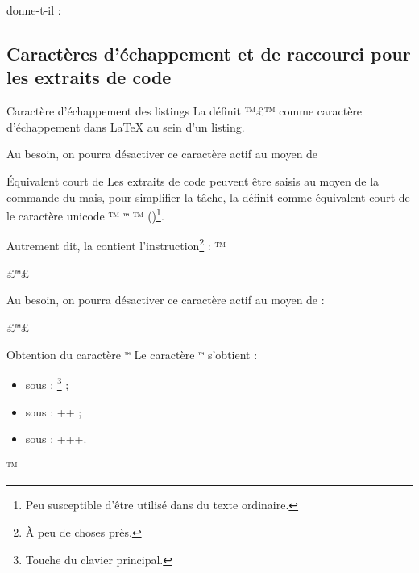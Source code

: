 \documentclass{letgut}
\begin{document}
donne-t-il :

\endgroup

\subsection{Caractères d'échappement et de raccourci pour les
  extraits de code}
\label{sec:caract-dech-et}

\begin{dbwarning}{Caractère d'échappement des listings}{}
  \lstset{escapechar=}%
  La  définit ™£™ comme caractère d'échappement dans \LaTeX{} au
  sein d'un listing.
\end{dbwarning}

Au besoin, on pourra désactiver ce caractère actif au moyen de
\begin{ltx-code}
\lstset{escapechar=}
\end{ltx-code}

\begin{dbwarning}{Équivalent court de }{}
  Les extraits de code peuvent être saisis au moyen de la commande
   du  mais, pour
  simplifier la tâche, la  définit comme équivalent court
  de  le caractère unicode %
  \lstDeleteShortInline™%
  \texttt{™} %
  \lstMakeShortInline™%
  ()\footnote{Peu susceptible d'être utilisé dans du texte
    ordinaire.}.
\end{dbwarning}

Autrement dit, la  contient l'instruction\footnote{À peu
  de choses près.} :
  \lstDeleteShortInline™
\begin{ltx-code}
\lstMakeShortInline£\texttt{™}£
\end{ltx-code}

  Au besoin, on pourra désactiver ce caractère actif au moyen de :
\begin{ltx-code}
\lstDeleteShortInline£\texttt{™}£
\end{ltx-code}

\begin{dbremark}{Obtention du caractère \texttt{™}}{}
Le caractère %
\texttt{™} %
s'obtient :
\begin{itemize}
\item sous \linux{} : \footnote{Touche  du clavier
    principal.} ;
\item sous \macos{} : \LKeyShift+\LKeyOptionKey+ ;
\item sous \windows{} : +++.
\end{itemize}
\end{dbremark}
  \lstMakeShortInline™%
\end{document}
